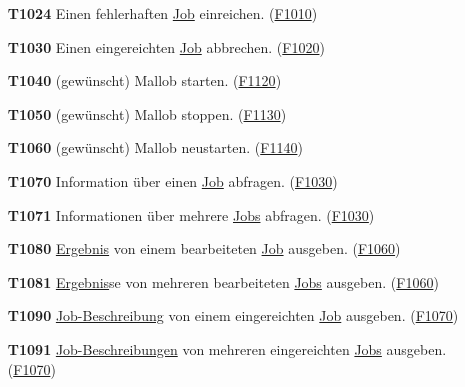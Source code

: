 \begin{itemize}
    \item[\textbf{T1024}] Einen fehlerhaften \hyperref[B:Jobs]{Job} einreichen. (\hyperref[FA:API:Einreichen von Jobs]{F1010})
    
    \item[\textbf{T1030}] Einen eingereichten \hyperref[B:Jobs]{Job} abbrechen. (\hyperref[FA:API:Abbrechen von eingereichten Jobs]{F1020})
    
    \item[\textbf{T1040}] (gewünscht) \gls{Mallob} starten. (\hyperref[FA:API:Starten von Mallob]{F1120})
    
    \item[\textbf{T1050}] (gewünscht) \gls{Mallob} stoppen. (\hyperref[FA:API:Stoppen von Mallob]{F1130})
    
    \item[\textbf{T1060}] (gewünscht) \gls{Mallob} neustarten. (\hyperref[FA:API:Neustart von Mallob]{F1140})
    
    \item[\textbf{T1070}] Information über einen \hyperref[B:Jobs]{Job} abfragen. (\hyperref[FA:API:Abfragen der Informationenen von Jobs]{F1030})
    
    \item[\textbf{T1071}] Informationen über mehrere \hyperref[B:Jobs]{Jobs} abfragen. (\hyperref[FA:API:Abfragen der Informationenen von Jobs]{F1030})
    
    \item[\textbf{T1080}] \hyperref[B:Job-Ergebnis]{Ergebnis} von einem bearbeiteten \hyperref[B:Jobs]{Job} ausgeben. (\hyperref[FA:API:Ausgeben des Ergebnisses für eine oder mehrere Jobs]{F1060})
    
    \item[\textbf{T1081}] \hyperref[B:Job-Ergebnis]{Ergebnis}se von mehreren bearbeiteten \hyperref[B:Jobs]{Jobs} ausgeben. (\hyperref[FA:API:Ausgeben des Ergebnisses für eine oder mehrere Jobs]{F1060})
    
    \item[\textbf{T1090}] \hyperref[B:Job-Beschreibung]{Job-Beschreibung} von einem eingereichten \hyperref[B:Jobs]{Job} ausgeben. (\hyperref[FA:API:Ausgeben der Job-Beschreibung]{F1070})
    
    \item[\textbf{T1091}] \hyperref[B:Job-Beschreibung]{Job-Beschreibungen} von mehreren eingereichten \hyperref[B:Jobs]{Jobs} ausgeben. (\hyperref[FA:API:Ausgeben der Job-Beschreibung]{F1070})
    

\end{itemize}
